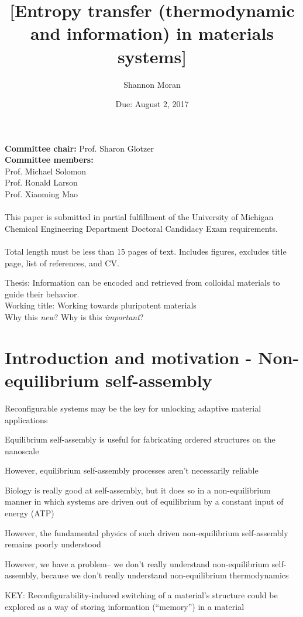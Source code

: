\documentclass[11pt, oneside]{article}   	%
\title{[Entropy transfer (thermodynamic and information) in materials systems]}
\author{Shannon Moran}
\date{Due: August 2, 2017}
\begin{document}
\maketitle
\thispagestyle{empty}
\noindent
\textbf{Committee chair:} Prof. Sharon Glotzer \\ \textbf{Committee members:} \\ Prof. Michael Solomon \\ Prof. Ronald Larson \\ Prof. Xiaoming Mao
\\ \\
\noindent 
This paper is submitted in partial fulfillment of the University of Michigan Chemical Engineering Department Doctoral Candidacy Exam requirements.
\\ \\
Total length must be less than 15 pages of text. Includes figures, excludes title page, list of references, and CV.
\newpage


Thesis: Information can be encoded and retrieved from colloidal materials to guide their behavior. \\
Working title: Working towards pluripotent materials \\
Why this \textit{new}? Why is this \textit{important}?

\section{Introduction and motivation - Non-equilibrium self-assembly}

Reconfigurable systems may be the key for unlocking adaptive material applications

Equilibrium self-assembly is useful for fabricating ordered structures on the nanoscale

However, equilibrium self-assembly processes aren't necessarily reliable 

Biology is really good at self-assembly, but it does so in a non-equilibrium manner in which systems are driven out of equilibrium by a constant input of energy (ATP)

However, the fundamental physics of such driven non-equilibrium self-assembly remains poorly understood

However, we have a problem-- we don't really understand non-equilibrium self-assembly, because we don't really understand non-equilibrium thermodynamics

KEY: 
Reconfigurability-induced switching of a material's structure could be explored as a way of storing information (``memory'') in a material
\end{document}
